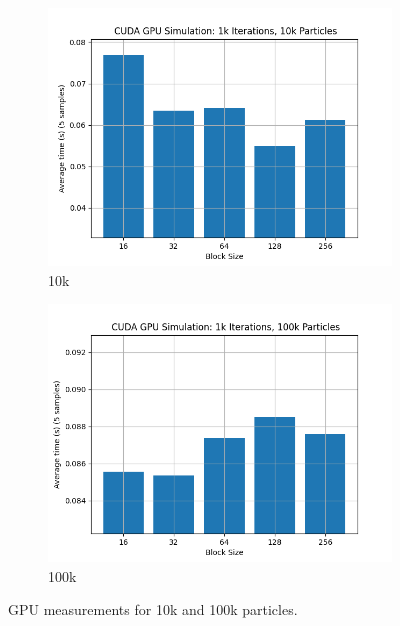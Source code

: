 \documentclass[a4paper, 12pt]{article}
\begin{document}
\begin{figure}
    \centering
    \begin{subfigure}{.5\textwidth}
      \centering
      \includegraphics[width=1\linewidth]{graphs/ex_3_graph_gpu_10k.png}
      \caption{10k}
      \label{fig:ex-3-gpu-10k}
    \end{subfigure}%
    \begin{subfigure}{.5\textwidth}
      \centering
      \includegraphics[width=1\linewidth]{graphs/ex_3_graph_gpu_100k.png}
      \caption{100k}
      \label{fig:ex-3-gpu-100k}
    \end{subfigure}
    \caption{GPU measurements for 10k and 100k particles.}
    \label{fig:test}
\end{figure}
\end{document}

